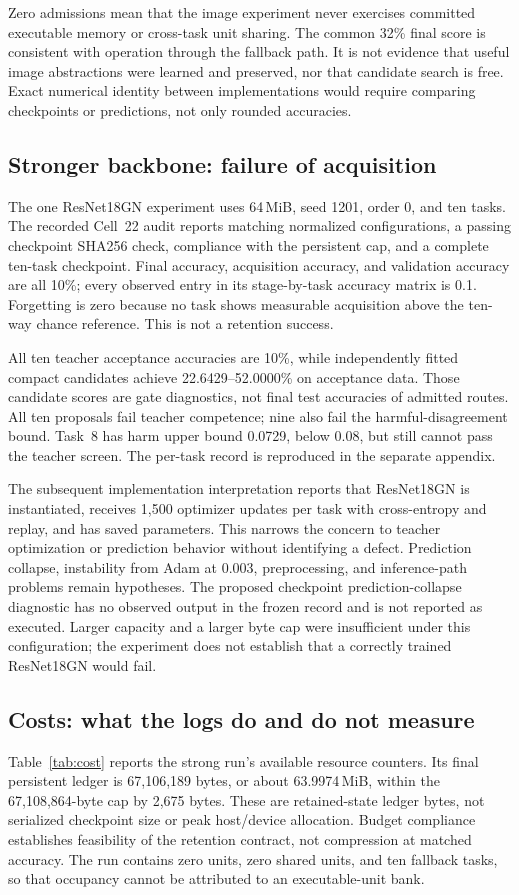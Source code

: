 \documentclass{article}
\begin{document}


Zero admissions mean that the image experiment never exercises committed executable memory or cross-task unit sharing. The common 32\% final score is consistent with operation through the fallback path. It is not evidence that useful image abstractions were learned and preserved, nor that candidate search is free. Exact numerical identity between implementations would require comparing checkpoints or predictions, not only rounded accuracies.

\subsection{Stronger backbone: failure of acquisition}
The one ResNet18GN experiment uses 64\,MiB, seed 1201, order 0, and ten tasks. The recorded Cell~22 audit reports matching normalized configurations, a passing checkpoint SHA256 check, compliance with the persistent cap, and a complete ten-task checkpoint. Final accuracy, acquisition accuracy, and validation accuracy are all 10\%; every observed entry in its stage-by-task accuracy matrix is 0.1. Forgetting is zero because no task shows measurable acquisition above the ten-way chance reference. This is not a retention success.

All ten teacher acceptance accuracies are 10\%, while independently fitted compact candidates achieve 22.6429--52.0000\% on acceptance data. Those candidate scores are gate diagnostics, not final test accuracies of admitted routes. All ten proposals fail teacher competence; nine also fail the harmful-disagreement bound. Task~8 has harm upper bound 0.0729, below 0.08, but still cannot pass the teacher screen. The per-task record is reproduced in the separate appendix.

The subsequent implementation interpretation reports that ResNet18GN is instantiated, receives 1,500 optimizer updates per task with cross-entropy and replay, and has saved parameters. This narrows the concern to teacher optimization or prediction behavior without identifying a defect. Prediction collapse, instability from Adam at 0.003, preprocessing, and inference-path problems remain hypotheses. The proposed checkpoint prediction-collapse diagnostic has no observed output in the frozen record and is not reported as executed. Larger capacity and a larger byte cap were insufficient under this configuration; the experiment does not establish that a correctly trained ResNet18GN would fail.

\subsection{Costs: what the logs do and do not measure}
Table~\ref{tab:cost} reports the strong run's available resource counters. Its final persistent ledger is 67,106,189 bytes, or about 63.9974\,MiB, within the 67,108,864-byte cap by 2,675 bytes. These are retained-state ledger bytes, not serialized checkpoint size or peak host/device allocation. Budget compliance establishes feasibility of the retention contract, not compression at matched accuracy. The run contains zero units, zero shared units, and ten fallback tasks, so that occupancy cannot be attributed to an executable-unit bank.
\end{document}
